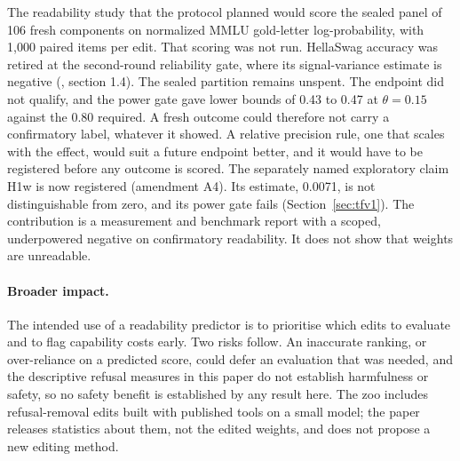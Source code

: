 The readability study that the protocol planned would score the sealed panel of 106 fresh components on normalized MMLU gold-letter log-probability, with 1,000 paired items per edit. That scoring was not run. HellaSwag accuracy was retired at the second-round reliability gate, where its signal-variance estimate is negative (, section 1.4). The sealed partition remains unspent. The endpoint did not qualify, and the power gate gave lower bounds of 0.43 to 0.47 at $\theta = 0.15$ against the 0.80 required. A fresh outcome could therefore not carry a confirmatory label, whatever it showed. A relative precision rule, one that scales with the effect, would suit a future endpoint better, and it would have to be registered before any outcome is scored. %
The separately named exploratory claim H1w is now registered (amendment A4). Its estimate, 0.0071, is not distinguishable from zero, and its power gate fails (Section~\ref{sec:tfv1}).
The contribution is a measurement and benchmark report with a scoped, underpowered negative on confirmatory readability. It does not show that weights are unreadable.

\paragraph{Broader impact.} The intended use of a readability predictor is to prioritise which edits to evaluate and to flag capability costs early. Two risks follow. An inaccurate ranking, or over-reliance on a predicted score, could defer an evaluation that was needed, and the descriptive refusal measures in this paper do not establish harmfulness or safety, so no safety benefit is established by any result here. The zoo includes refusal-removal edits built with published tools on a small model; the paper releases statistics about them, not the edited weights, and does not propose a new editing method.
